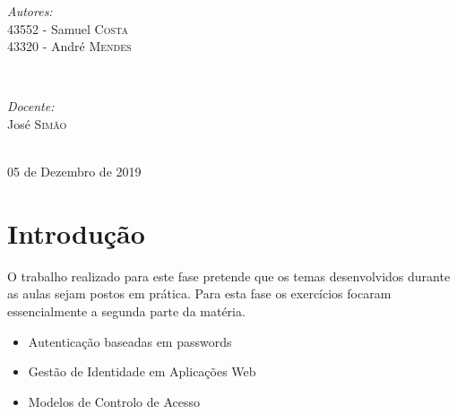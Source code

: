 \documentclass[11pt]{report}
\begin{document}
\begin{titlepage}
\vskip 70pt
\begin{minipage}{0.4\textwidth}
\begin{flushleft} \large
\emph{Autores:}\\
43552 - Samuel \textsc{Costa}\\
43320 - André \textsc{Mendes}
\end{flushleft}
\end{minipage}
~
\begin{minipage}{0.4\textwidth}
\begin{flushright} \large
\emph{Docente:} \\
José \textsc{Simão}\\
\end{flushright}
\end{minipage}\\[3cm]


{\large 05 de Dezembro de 2019}\\[3cm] %


\vfill %

\end{titlepage}


\renewcommand\thesection{\arabic{section}}

\tableofcontents


\newpage


\section*{Introdução}
O trabalho realizado para este fase pretende que os temas desenvolvidos durante as aulas sejam postos em prática. Para esta fase os exercícios focaram essencialmente a segunda parte da matéria.\\

\begin{itemize}
  \item Autenticação baseadas em passwords
  \item Gestão de Identidade em Aplicações Web
  \item Modelos de Controlo de Acesso
\end{itemize}
\end{document}
